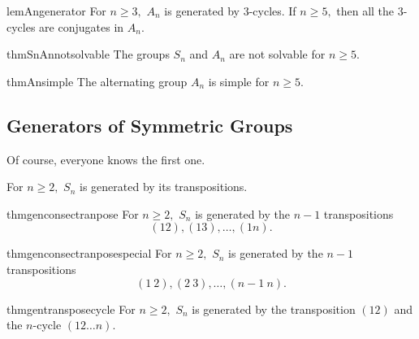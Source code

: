 \begin{restatable}[]{lem}{Angenerator}
\label{lem:Angenerator}
	For $n \ge 3,$ $A_n$ is generated by $3$-cycles. If $n \ge 5,$ then all the $3$-cycles are conjugates in $A_n.$ \hfill\hyperref[lem:Angenerator2]{\downsym}
\end{restatable}

\begin{restatable}[]{thm}{SnAnnotsolvable}
\label{thm:SnAnnotsolvable}
	The groups $S_n$ and $A_n$ are not solvable for $n \ge 5.$ \hfill\hyperref[thm:SnAnnotsolvable2]{\downsym}
\end{restatable}

\begin{restatable}[]{thm}{Ansimple}
\label{thm:Ansimple}
	The alternating group $A_n$ is simple for $n \ge 5.$ \hfill\hyperref[thm:Ansimple2]{\downsym}
\end{restatable}

\subsection{Generators of Symmetric Groups}

Of course, everyone knows the first one.

\begin{thm} \label{thm:gentranspose}
	For $n \ge 2,$ $S_n$ is generated by its transpositions.
\end{thm}

\begin{restatable}[]{thm}{genconsectranpose}
\label{thm:genconsectranpose}
	For $n \ge 2,$ $S_n$ is generated by the $n - 1$ transpositions
	\begin{equation*} 
		(12), (13), \ldots, (1n).
	\end{equation*} \hfill\hyperref[thm:genconsectranpose2]{\downsym}
\end{restatable}

\begin{restatable}[]{thm}{genconsectranposespecial}
\label{thm:genconsectranposespecial}
	For $n \ge 2,$ $S_n$ is generated by the $n - 1$ transpositions
	\begin{equation*} 
		(1 \ 2), (2 \ 3), \ldots, (n - 1 \ n).
	\end{equation*}  \hfill\hyperref[thm:genconsectranposespecial2]{\downsym}
\end{restatable}

\begin{restatable}[]{thm}{gentransposecycle}
\label{thm:gentransposecycle}
	For $n \ge 2,$ $S_n$ is generated by the transposition $(12)$ and the $n$-cycle $(12 \ldots n).$ \hfill\hyperref[thm:gentransposecycle2]{\downsym}
\end{restatable}

